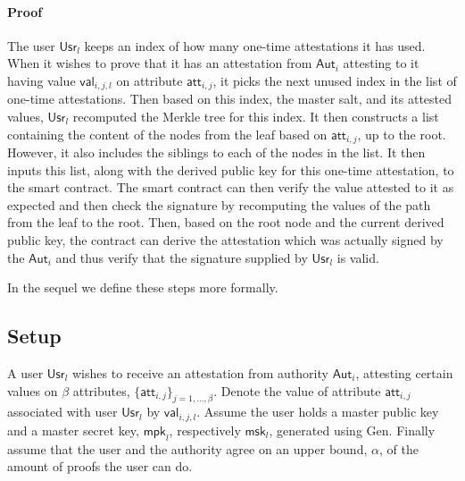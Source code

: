 \documentclass[11pt]{article} %
\newcommand{\aut}{\ensuremath{\mathsf{Aut}_i}}
\newcommand{\att}{\ensuremath{\mathsf{att}_{i,j}}}
\newcommand{\val}{\ensuremath{\mathsf{val}_{i,j,l}}}
\newcommand{\usr}{\ensuremath{\mathsf{Usr}_l}}
\newcommand{\mpk}{\ensuremath{\mathsf{mpk}}}
\newcommand{\msk}{\ensuremath{\mathsf{msk}}}
\begin{document}
\paragraph{Proof}
The user $\usr$ keeps an index of how many one-time attestations it has used. When it wishes to prove that it has an attestation from $\aut$ attesting to it having value $\val$ on attribute $\att$, it picks the next unused index in the list of one-time attestations. Then based on this index, the master salt, and its attested values, $\usr$ recomputed the Merkle tree for this index. It then constructs a list containing the content of the nodes from the leaf based on $\att$, up to the root. However, it also includes the siblings to each of the nodes in the list. It then inputs this list, along with the derived public key for this one-time attestation, to the smart contract. The smart contract can then verify the value attested to it as expected and then check the signature by recomputing the values of the path from the leaf to the root. Then, based on the root node and the current derived public key, the contract can derive the attestation which was actually signed by the $\aut$ and thus verify that the signature supplied by $\usr$ is valid.

In the sequel we define these steps more formally.

\subsection{Setup}
A user $\usr$ wishes to receive an attestation from authority $\aut$, attesting certain values on $\beta$ attributes, $\{\att\}_{j=1, \dots, \beta}$. Denote the value of attribute $\att$ associated with user $\usr$ by $\val$. Assume the user holds a master public key and a master secret key, $\mpk_l$, respectively $\msk_l$, generated using $\mathrm{Gen}$. Finally assume that the user and the authority agree on an upper bound, $\alpha$, of the amount of proofs the user can do. 
\end{document}
